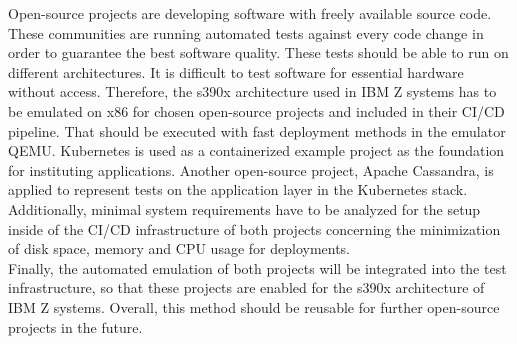 Open-source projects are developing software with freely available source code. These communities are running automated tests against every code change in order to guarantee the best software quality. 
These tests should be able to run on different architectures. It is difficult to test software for essential hardware without access. Therefore, the \gls{s390x} architecture used in IBM \gls{Z systems} has to be emulated on x86 for chosen open-source projects and included in their \gls{CI/CD} pipeline. 
That should be executed with fast deployment methods in the \gls{emulator} QEMU. 
Kubernetes is used as a \gls{containerized} example project as the foundation for instituting applications. Another open-source project, Apache Cassandra, is applied to represent tests on the \gls{application layer} in the Kubernetes stack. \\
Additionally, minimal system requirements have to be analyzed for the setup inside of the CI/CD infrastructure of both projects concerning the minimization of disk space, memory and CPU usage for deployments. \\
Finally, the automated emulation of both projects will be integrated into the test infrastructure, so that these projects are enabled for the s390x architecture of IBM Z systems. Overall, this method should be reusable for further open-source projects in the future.


